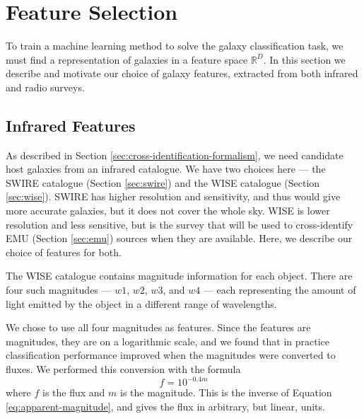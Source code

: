 \section{Feature Selection}
\label{sec:features}

  To train a machine learning method to solve the galaxy classification task,
  we must find a representation of galaxies in a feature space $\mathbb{R}^D$.
  In this section we describe and motivate our choice of galaxy features,
  extracted from both infrared and radio surveys.

  \subsection{Infrared Features}
  \label{sec:ir-features}

    As described in Section \ref{sec:cross-identification-formalism}, we need
    candidate host galaxies from an infrared catalogue. We have two choices here
    --- the SWIRE catalogue (Section \ref{sec:swire}) and the WISE catalogue
    (Section \ref{sec:wise}). SWIRE has higher resolution and sensitivity, and
    thus would give more accurate galaxies, but it does not cover the whole sky.
    WISE is lower resolution and less sensitive, but is the survey that will be
    used to cross-identify EMU (Section \ref{sec:emu}) sources when they are
    available. Here, we describe our choice of features for both.

    The WISE catalogue contains magnitude information for each object. There are
    four such magnitudes --- $w1$, $w2$, $w3$, and $w4$ --- each representing
    the amount of light emitted by the object in a different range of
    wavelengths.

    We chose to use all four magnitudes as features. Since the features are
    magnitudes, they are on a logarithmic scale, and we found that in practice
    classification performance improved when the magnitudes were converted to
    fluxes. We performed this conversion with the formula
    \[
      f = 10^{-0.4m}
    \]
    where $f$ is the flux and $m$ is the magnitude. This is the inverse of
    Equation \ref{eq:apparent-magnitude}, and gives the flux in arbitrary, but
    linear, units.

